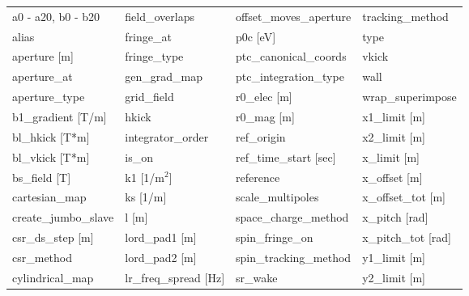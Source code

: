  \begin{tabular}{llll} \toprule
a0 - a20, b0 - b20               & field_overlaps                   & offset_moves_aperture            & tracking_method                  \\
alias                            & fringe_at                        & p0c [eV]                         & type                             \\
aperture [m]                     & fringe_type                      & ptc_canonical_coords             & vkick                            \\
aperture_at                      & gen_grad_map                     & ptc_integration_type             & wall                             \\
aperture_type                    & grid_field                       & r0_elec [m]                      & wrap_superimpose                 \\
b1_gradient [T/m]                & hkick                            & r0_mag [m]                       & x1_limit [m]                     \\
bl_hkick [T*m]                   & integrator_order                 & ref_origin                       & x2_limit [m]                     \\
bl_vkick [T*m]                   & is_on                            & ref_time_start [sec]             & x_limit [m]                      \\
bs_field [T]                     & k1 [1/m$^2$]                     & reference                        & x_offset [m]                     \\
cartesian_map                    & ks [1/m]                         & scale_multipoles                 & x_offset_tot [m]                 \\
create_jumbo_slave               & l [m]                            & space_charge_method              & x_pitch [rad]                    \\
csr_ds_step [m]                  & lord_pad1 [m]                    & spin_fringe_on                   & x_pitch_tot [rad]                \\
csr_method                       & lord_pad2 [m]                    & spin_tracking_method             & y1_limit [m]                     \\
cylindrical_map                  & lr_freq_spread [Hz]              & sr_wake                          & y2_limit [m]                     \\

\end{tabular}
